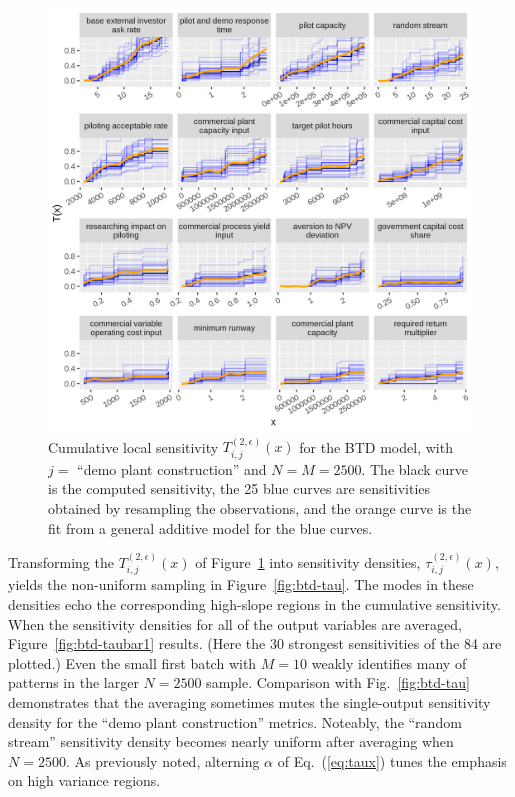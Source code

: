 \documentclass[12pt]{article}
\begin{document}
\begin{figure}
    \centering
    \includegraphics[width=\linewidth]{figures/btd-t.png}
    \caption{Cumulative local sensitivity $T_{i,j}^{(2,\epsilon)}(x)$ for the BTD model, with $j =$ ``demo plant construction'' and $N = M = 2500$. The black curve is the computed sensitivity, the 25 blue curves are sensitivities obtained by resampling the observations, and the orange curve is the fit from a general additive model for the blue curves.}
    \label{fig:btd-t}
\end{figure}

Transforming the $T_{i,j}^{(2,\epsilon)}(x)$ of Figure~\ref{fig:btd-t} into sensitivity densities, $\tau_{i,j}^{(2,\epsilon)}(x)$, yields the non-uniform sampling in Figure~\ref{fig:btd-tau}. The modes in these densities echo the corresponding high-slope regions in the cumulative sensitivity. When the sensitivity densities for all of the output variables are averaged, Figure~\ref{fig:btd-taubar1} results. (Here the 30 strongest sensitivities of the 84 are plotted.) Even the small first batch with $M = 10$ weakly identifies many of patterns in the larger $N = 2500$ sample. Comparison with Fig.~\ref{fig:btd-tau} demonstrates that the averaging sometimes mutes the single-output sensitivity density for the ``demo plant construction'' metrics. Noteably, the ``random stream'' sensitivity density becomes nearly uniform after averaging when $N = 2500$. As previously noted, alterning $\alpha$ of Eq.~(\ref{eq:taux}) tunes the emphasis on high variance regions.
\end{document}
